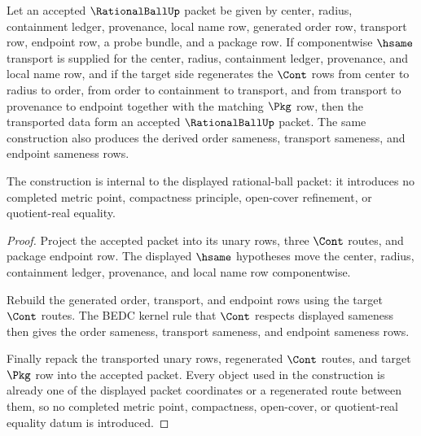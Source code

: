 \begin{theorem}
\label{thm:rationalball-full-packet-refinement-transport}
Let an accepted $\RationalBallUp$ packet be given by center, radius,
containment ledger, provenance, local name row, generated order row, transport
row, endpoint row, a probe bundle, and a package row. If componentwise
$\hsame$ transport is supplied for the center, radius, containment ledger,
provenance, and local name row, and if the target side regenerates the
$\Cont$ rows from center to radius to order, from order to containment to
transport, and from transport to provenance to endpoint together with the
matching $\Pkg$ row, then the transported data form an accepted
$\RationalBallUp$ packet. The same construction also produces the derived
order sameness, transport sameness, and endpoint sameness rows.

The construction is internal to the displayed rational-ball packet: it
introduces no completed metric point, compactness principle, open-cover
refinement, or quotient-real equality.
\end{theorem}
\begin{proof}
Project the accepted packet into its unary rows, three $\Cont$ routes, and
package endpoint row. The displayed $\hsame$ hypotheses move the center,
radius, containment ledger, provenance, and local name row componentwise.

Rebuild the generated order, transport, and endpoint rows using the target
$\Cont$ routes. The BEDC kernel rule that $\Cont$ respects displayed sameness
then gives the order sameness, transport sameness, and endpoint sameness rows.

Finally repack the transported unary rows, regenerated $\Cont$ routes, and
target $\Pkg$ row into the accepted packet. Every object used in the
construction is already one of the displayed packet coordinates or a
regenerated route between them, so no completed metric point, compactness,
open-cover, or quotient-real equality datum is introduced.
\end{proof}

